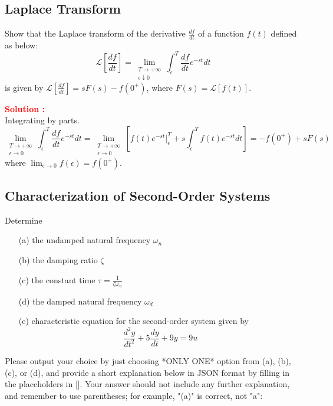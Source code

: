 \documentclass[12pt]{article}
\begin{document}
\clearpage
\subsection{Laplace Transform}

Show that the Laplace transform of the derivative \(\frac{df}{dt}\) of a function \(f(t)\) defined as below:
\begin{equation}
    \mathcal{L}\left[ \frac{df}{dt} \right] = \lim_{\substack{T \to +\infty \\ \epsilon \downarrow 0}} \int_{\epsilon}^T \frac{df}{dt} e^{-st} dt
\end{equation}
is given by \(\mathcal{L}\left[ \frac{df}{dt} \right] = sF(s)-f(0^+)\), where \(F(s) = \mathcal{L}[f(t)]\).

\textbf{\textcolor{red}{Solution :}} \\
Integrating by parts.
\begin{equation}
    \lim_{\substack{T \to +\infty \\ \epsilon \to 0}} \int_{\epsilon}^T \frac{df}{dt} e^{-st} dt = \lim_{\substack{T \to +\infty \\ \epsilon \to 0}} \left[ f(t) e^{-st}|_{\epsilon}^T + s \int_{\epsilon}^T f(t) e^{-st} dt\right] = -f(0^+)+s F(s)
\end{equation}
where \(\lim_{\epsilon \rightarrow 0}f(\epsilon) = f(0^+)\).

\clearpage
\subsection{Characterization of Second-Order Systems}

Determine
\begin{itemize}
    \item[(a)] the undamped natural frequency \(\omega_n\)
    \item[(b)] the damping ratio \(\zeta\)
    \item[(c)] the constant time \(\tau = \frac{1}{\zeta \omega_n}\)
    \item[(d)] the damped natural frequency \(\omega_d\)
    \item[(e)] characteristic equation for the second-order system given by
    \begin{equation}
        \frac{d^2y}{dt^2} + 5 \frac{dy}{dt} + 9 y = 9u
    \end{equation}
\end{itemize}
Please output your choice by just choosing *ONLY ONE* option from (a), (b), (c), or (d), and provide a short explanation below in JSON format by filling in the placeholders in []. Your answer should not include any further explanation, and remember to use parentheses; for example, "(a)" is correct, not "a":
\end{document}
